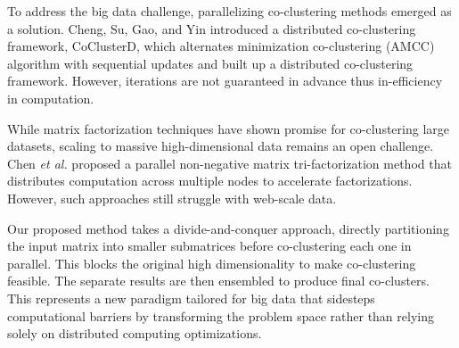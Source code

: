 To address the big data challenge, parallelizing co-clustering methods emerged as a solution. Cheng, Su, Gao, and Yin introduced a distributed co-clustering framework, CoClusterD\cite{cheng2015CoClusterDDistributedFramework}, which alternates minimization co-clustering (AMCC) algorithm with sequential updates and built up a distributed co-clustering framework. However, iterations are not guaranteed in advance thus in-efficiency in computation.

While matrix factorization techniques have shown promise for co-clustering large datasets, scaling to massive high-dimensional data remains an open challenge. Chen \textit{et al.}\cite{chen2023ParallelNonNegativeMatrix} proposed a parallel non-negative matrix tri-factorization method that distributes computation across multiple nodes to accelerate factorizations. However, such approaches still struggle with web-scale data.

Our proposed method takes a divide-and-conquer approach, directly partitioning the input matrix into smaller submatrices before co-clustering each one in parallel. This blocks the original high dimensionality to make co-clustering feasible. The separate results are then ensembled to produce final co-clusters. This represents a new paradigm tailored for big data that sidesteps computational barriers by transforming the problem space rather than relying solely on distributed computing optimizations.